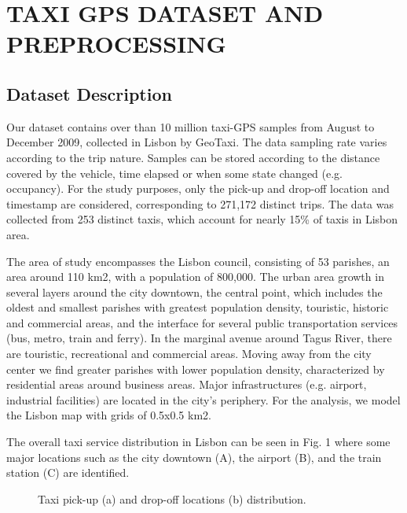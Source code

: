 \documentclass[a4paper, 10pt, conference]{ieeeconf}      %
\begin{document}
\section{TAXI GPS DATASET AND PREPROCESSING}%

\subsection{Dataset Description} 

Our dataset contains over than 10 million taxi-GPS samples from August to December 2009, collected in Lisbon by GeoTaxi. The data sampling rate varies according to the trip nature. Samples can be stored according to the distance covered by the vehicle, time elapsed or when some state changed (e.g. occupancy). For the study purposes, only the pick-up and drop-off location and timestamp are considered, corresponding to 271,172 distinct trips. The data was collected from 253 distinct taxis, which account for nearly 15\% of taxis in Lisbon area. 

The area of study encompasses the Lisbon council, consisting of 53 parishes, an area around 110 km2, with a population of 800,000. The urban area growth in several layers around the city downtown, the central point, which includes the oldest and smallest parishes with greatest population density, touristic, historic and commercial areas, and the interface for several public transportation services (bus, metro, train and ferry).  In the marginal avenue around Tagus River, there are touristic, recreational and commercial areas. Moving away from the city center we find greater parishes with lower population density, characterized by residential areas around business areas. Major infrastructures (e.g. airport, industrial facilities) are located in the city’s periphery. For the analysis, we model the Lisbon map with grids of 0.5x0.5 km2. 

The overall taxi service distribution in Lisbon can be seen in Fig. 1 where some major locations such as the city downtown (A), the airport (B), and the train station (C) are identified.  

\begin{figure}[htbp]
    \centering

    \caption{ Taxi pick-up (a) and drop-off locations (b) distribution. }
    \label{fig:my_png_1}
\end{figure}
\end{document}
